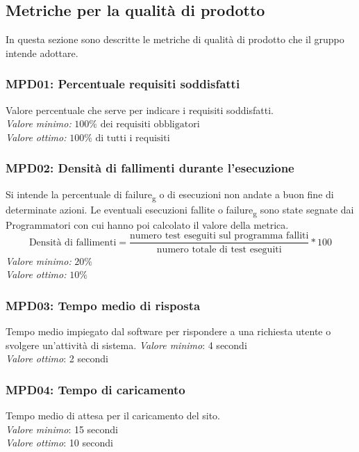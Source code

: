 \subsection{Metriche per la qualità di prodotto}
In questa sezione sono descritte le metriche di qualità di prodotto che il gruppo intende adottare.

\subsubsection{MPD01: Percentuale requisiti soddisfatti}
Valore percentuale che serve per indicare i requisiti soddisfatti.\\
\textit{Valore minimo:} $100\% \text{ dei requisiti obbligatori}$\\
\textit{Valore ottimo:} $100\% \text{ di tutti i requisiti}$

\subsubsection{MPD02: Densità di fallimenti durante l'esecuzione}
Si intende la percentuale di failure\textsubscript{g} o di esecuzioni non andate a buon fine di determinate azioni.
 Le eventuali esecuzioni fallite o failure\textsubscript{g} sono state segnate dai Programmatori con cui hanno poi calcolato il valore della metrica.
\begin{equation*}
\text{Densità di fallimenti}=\frac{\text{numero test eseguiti sul programma falliti}}{\text{numero totale di test eseguiti}}*100
\end{equation*}
\textit{Valore minimo:} $20\%$\\
\textit{Valore ottimo:} $10\%$

\subsubsection{MPD03: Tempo medio di risposta}
Tempo medio impiegato dal software per rispondere a una richiesta utente o svolgere un’attività di sistema.
\textit{Valore minimo}: 4 secondi\\
\textit{Valore ottimo}: 2 secondi\\

\subsubsection{MPD04: Tempo di caricamento}
Tempo medio di attesa per il caricamento del sito.\\
\textit{Valore minimo}: 15 secondi\\
\textit{Valore ottimo}: 10 secondi\\

